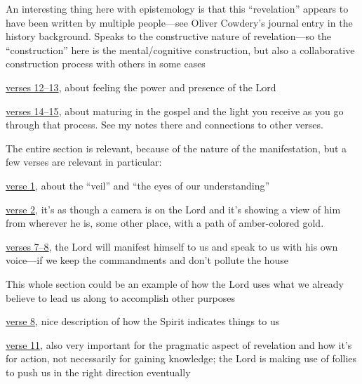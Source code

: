 \begin{compactdesc}
				\begin{compactitem}
					\item An interesting thing here with epistemology is that this ``revelation'' appears to have been written by multiple people---see Oliver Cowdery's journal entry in the history background. Speaks to the constructive nature of revelation---so the ``construction'' here is the mental/cognitive construction, but also a collaborative construction process with others in some cases
					\item \hyperref[DC109-12]{verses 12--13}, about feeling the power and presence of the Lord
					\item \hyperref[DC109-14]{verses 14--15}, about maturing in the gospel and the light you receive as you go through that process. See my notes there and connections to other verses.
				\end{compactitem}
			\item[{\hyperref[DC110]{DC 110}}] The entire section is relevant, because of the nature of the manifestation, but a few verses are relevant in particular:
				\begin{compactitem}
					\item \hyperref[DC110-1]{verse 1}, about the ``veil'' and ``the eyes of our understanding''
					\item \hyperref[DC110-2]{verse 2}, it's as though a camera is on the Lord and it's showing a view of him from wherever he is, some other place, with a path of amber-colored gold.
					\item \hyperref[DC110-7]{verses 7--8}, the Lord will manifest himself to us and speak to us with his own voice---if we keep the commandments and don't pollute the house
				\end{compactitem}
			\item[{\hyperref[DC111]{DC 111}}] This whole section could be an example of how the Lord uses what we already believe to lead us along to accomplish other purposes
				\begin{compactitem}
					\item \hyperref[DC111-8]{verse 8}, nice description of how the Spirit indicates things to us
					\item \hyperref[DC111-11]{verse 11}, also very important for the pragmatic aspect of revelation and how it's for action, not necessarily for gaining knowledge; the Lord is making use of follies to push us in the right direction eventually
				\end{compactitem}
			\item[{\hyperref[DC112]{DC 112}}]

\end{compactdesc}
